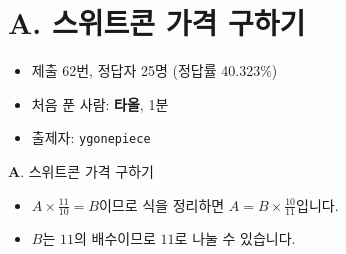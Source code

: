 \section{A. 스위트콘 가격 구하기}

\begin{frame} %
    \begin{itemize}
        \item 제출 62번, 정답자 25명 (정답률 40.323\%)
        \item 처음 푼 사람: \textbf{타올}, 1분
        \item 출제자: \texttt{ygonepiece}
    \end{itemize}
\end{frame}

\begin{frame}{\textbf{A}. 스위트콘 가격 구하기}
    \begin{itemize}
        \item $A \times \frac{11}{10} = B$이므로 식을 정리하면 $A = B \times \frac{10}{11}$입니다.
        \item $B$는 $11$의 배수이므로 $11$로 나눌 수 있습니다.
    \end{itemize}
\end{frame}